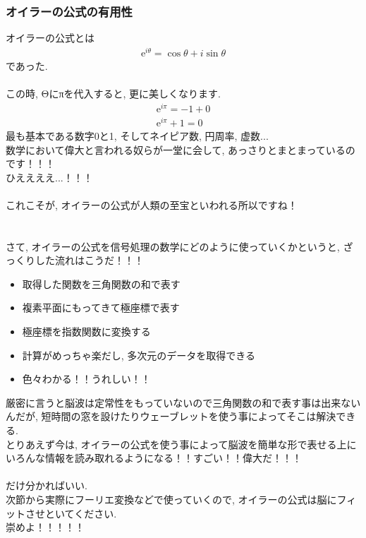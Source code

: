\documentclass[11pt,a4paper]{jsarticle}
\begin{document}
\subsubsection{オイラーの公式の有用性}
オイラーの公式とは
\begin{eqnarray}
\mathrm{e}^{i\theta} = \cos \theta + i\sin \theta
\end{eqnarray}
であった.\\
\\
この時, Θにπを代入すると, 更に美しくなります.
\\
\begin{eqnarray}
\mathrm{e}^{i\pi} = -1 + 0\\
\mathrm{e}^{i\pi} + 1 = 0
\end{eqnarray}
最も基本である数字0と1, そしてネイピア数, 円周率, 虚数...\\
数学において偉大と言われる奴らが一堂に会して, あっさりとまとまっているのです！！！\\
ひええええ...！！！\\
\\
これこそが, オイラーの公式が人類の至宝といわれる所以ですね！\\
\\
\\
さて, オイラーの公式を信号処理の数学にどのように使っていくかというと, ざっくりした流れはこうだ！！！\\
\begin{itemize}
 \item 取得した関数を三角関数の和で表す
 \item 複素平面にもってきて極座標で表す
 \item 極座標を指数関数に変換する
 \item 計算がめっちゃ楽だし, 多次元のデータを取得できる
 \item 色々わかる！！うれしい！！
\end{itemize}
厳密に言うと脳波は定常性をもっていないので三角関数の和で表す事は出来ないんだが, 短時間の窓を設けたりウェーブレットを使う事によってそこは解決できる. \\
とりあえず今は, オイラーの公式を使う事によって脳波を簡単な形で表せる上にいろんな情報を読み取れるようになる！！すごい！！偉大だ！！！\\
\\
だけ分かればいい.\\
次節から実際にフーリエ変換などで使っていくので, オイラーの公式は脳にフィットさせといてください.\\

崇めよ！！！！！\\
\end{document}

